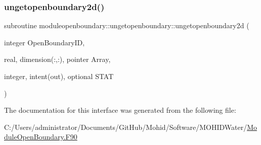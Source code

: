 \subsubsection{\texorpdfstring{ungetopenboundary2d()}{ungetopenboundary2d()}}
{\footnotesize\ttfamily subroutine moduleopenboundary\+::ungetopenboundary\+::ungetopenboundary2d (\begin{DoxyParamCaption}\item[{integer}]{Open\+Boundary\+ID,  }\item[{real, dimension(\+:,\+:), pointer}]{Array,  }\item[{integer, intent(out), optional}]{S\+T\+AT }\end{DoxyParamCaption})\hspace{0.3cm}{\ttfamily [private]}}



The documentation for this interface was generated from the following file\+:\begin{DoxyCompactItemize}
\item 
C\+:/\+Users/administrator/\+Documents/\+Git\+Hub/\+Mohid/\+Software/\+M\+O\+H\+I\+D\+Water/\mbox{\hyperlink{_module_open_boundary_8_f90}{Module\+Open\+Boundary.\+F90}}\end{DoxyCompactItemize}
